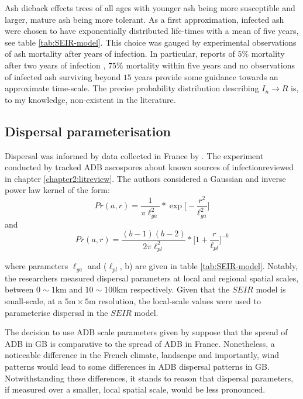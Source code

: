 Ash dieback effects trees of all ages with younger ash being more susceptible and larger, mature ash being more tolerant. 
As a first approximation, infected ash were chosen to have exponentially distributed life-times with a mean of five years, see table \ref{tab:SEIR-model}.
This choice was gauged by experimental observations of ash mortality after years of infection. 
In particular, reports of $5\%$ mortality after two years of infection \cite{kessler2012dieback}, $75\%$ mortality within five years \cite{langer2015ash}  %
and no observations of infected ash surviving beyond $15$ years \cite{wylder2018evidence} provide some guidance towards an approximate time-scale.
The precise probability distribution describing $I_{n}\rightarrow R$ is, to my knowledge, non-existent in the literature.\\

\subsection{Dispersal parameterisation}

Dispersal was informed by data collected in France by \cite{grosdidier2018tracking}.
The experiment conducted by \cite{grosdidier2018tracking} tracked ADB ascospores about known sources of infection\textemdash reviewed in chapter \ref{chapter2:litreview}.
The authors considered a Gaussian and inverse power law kernel of the form:
\begin{equation}
    Pr(a, r) = \frac{1}{\pi \ell_{ga}^2} * \exp\big[-\frac{r^2}{\ell_{ga}^2}\big]
\end{equation}
and
\begin{equation}
    Pr(a, r) = \frac{(b-1)(b-2)}{2\pi \ell_{pl}^2} * \big[ 1+ \frac{r}{\ell_{pl}}\big]^{-b}
\end{equation}

where parameters $\ell_{ga}$ and ($\ell_{pl}$, b) are given in table \ref{tab:SEIR-model}.
Notably, the researchers measured dispersal parameters at local and regional spatial scales, between $0 \sim 1\mathrm{km}$ and $10 \sim 100 \mathrm{km}$ respectively.
Given that the $SEIR$ model is small-scale, at a $5\mathrm{m} \times 5\mathrm{m}$ resolution, 
the local-scale values were used to parameterise dispersal in the $SEIR$ model.

The decision to use ADB scale parameters given by \cite{grosdidier2018tracking} suppose that the spread of ADB in GB is comparative to the spread of ADB in France. 
Nonetheless, a noticeable difference in the French climate, landscape and importantly, wind patterns would lead to some differences in ADB dispersal patterns in GB. %
Notwithstanding these differences, it stands to reason that dispersal parameters, if measured over a smaller, local spatial scale, would be less pronounced. 


